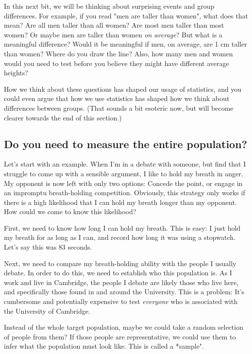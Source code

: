 \documentclass[11pt]{article}
\begin{document}
In this next bit, we will be thinking about surprising events and group
differences. For example, if you read "men are taller than women", what
does that mean? Are all men taller than all women? Are most men taller
than most women? Or maybe men are taller than women \emph{on average}?
But what is a meaningful difference? Would it be meaningful if men, on
average, are 1 cm taller than women? Where do you draw the line? Also,
how many men and women would you need to test before you believe they
might have different average heights?

How we think about these questions has shaped our usage of statistics,
and you could even argue that how we use statistics has shaped how we
think about differences between groups. (That sounds a bit esoteric now,
but will become clearer towards the end of this section.)

    \subsection{Do you need to measure the entire
population?}\label{do-you-need-to-measure-the-entire-population}

Let's start with an example. When I'm in a debate with someone, but find
that I struggle to come up with a sensible argument, I like to hold my
breath in anger. My opponent is now left with only two options: Concede
the point, or engage in an impromptu breath-holding competition.
Obviously, this strategy only works if there is a high likelihood that I
can hold my breath longer than my opponent. How could we come to know
this likelihood?

First, we need to know how long I can hold my breath. This is easy: I
just hold my breath for as long as I can, and record how long it was
using a stopwatch. Let's say this was 83 seconds.

Next, we need to compare my breath-holding ability with the people I
usually debate. In order to do this, we need to establish who this
population is. As I work and live in Cambridge, the people I debate are
likely those who live here, and specifically those found in and around
the University. This is a problem: It's cumbersome and potentially
expensive to test \emph{everyone} who is associated with the University
of Cambridge.

Instead of the whole target population, maybe we could take a random
selection of people from them? If those people are representative, we
could use them to infer what the population must look like. This is
called a *sample".
\end{document}

